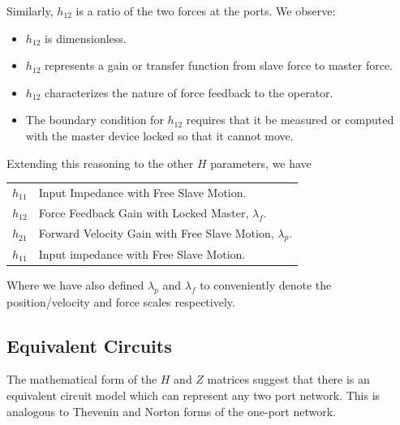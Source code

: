 Similarly, $h_{12}$ is a ratio of the two forces at the ports.   We observe:

\begin{itemize}
  \item $h_{12}$ is dimensionless.
  \item $h_{12}$ represents a gain or transfer function from slave force to master force.
  \item $h_{12}$ characterizes the nature of force feedback to the operator.
  \item The boundary condition for $h_{12}$ requires that it be measured or computed with the master device locked so that it cannot move.
\end{itemize}

Extending this reasoning to the other $H$ parameters, we have

\vspace{0.25in}
\begin{tabular}{ll}
\hline
$h_{11}$        &    Input Impedance with Free Slave Motion.   \\
$h_{12}$        &    Force Feedback Gain with Locked Master, $\lambda_f$. \\
$h_{21}$        &    Forward Velocity Gain with Free Slave Motion,  $\lambda_p$.   \\
$h_{11}$        &    Input impedance with Free Slave Motion.   \\
\hline
\end{tabular}



\vspace{0.25in}
Where we have also defined $\lambda_p$ and $\lambda_f$ to conveniently denote the position/velocity and force scales respectively.	%


\subsection{Equivalent Circuits}

The mathematical form of the $H$ and $Z$ matrices suggest that there is an equivalent circuit model which can represent any two port network.   This is analogous to Thevenin and Norton forms of the one-port network.	%

